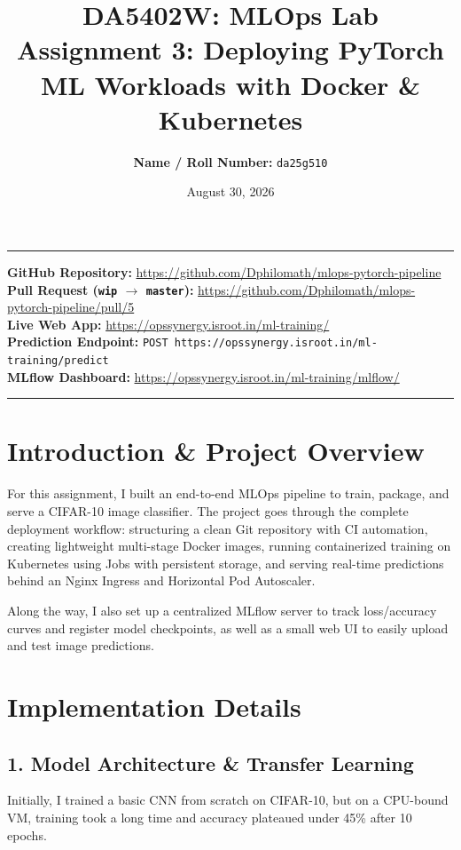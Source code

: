 \documentclass[11pt,a4paper]{article}
\title{\textbf{DA5402W: MLOps Lab}\\
\large Assignment 3: Deploying PyTorch ML Workloads with Docker \& Kubernetes}
\author{\textbf{Name / Roll Number:} \texttt{da25g510}}
\date{August 30, 2026}
\begin{document}
\maketitle

\vspace{-1em}
\noindent\rule{\textwidth}{0.4pt}
\vspace{0.3em}
\noindent\textbf{GitHub Repository:} \url{https://github.com/Dphilomath/mlops-pytorch-pipeline} \\
\textbf{Pull Request (\texttt{wip} $\rightarrow$ \texttt{master}):} \url{https://github.com/Dphilomath/mlops-pytorch-pipeline/pull/5} \\
\textbf{Live Web App:} \url{https://opssynergy.isroot.in/ml-training/} \\
\textbf{Prediction Endpoint:} \texttt{POST https://opssynergy.isroot.in/ml-training/predict} \\
\textbf{MLflow Dashboard:} \url{https://opssynergy.isroot.in/ml-training/mlflow/}
\vspace{0.3em}
\noindent\rule{\textwidth}{0.4pt}

\section{Introduction \& Project Overview}
For this assignment, I built an end-to-end MLOps pipeline to train, package, and serve a CIFAR-10 image classifier. The project goes through the complete deployment workflow: structuring a clean Git repository with CI automation, creating lightweight multi-stage Docker images, running containerized training on Kubernetes using Jobs with persistent storage, and serving real-time predictions behind an Nginx Ingress and Horizontal Pod Autoscaler.

Along the way, I also set up a centralized MLflow server to track loss/accuracy curves and register model checkpoints, as well as a small web UI to easily upload and test image predictions.

\section{Implementation Details}

\subsection{1. Model Architecture \& Transfer Learning}
Initially, I trained a basic CNN from scratch on CIFAR-10, but on a CPU-bound VM, training took a long time and accuracy plateaued under 45\% after 10 epochs. 
\end{document}
